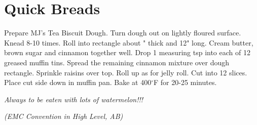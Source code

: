 \section{Quick Breads}
\begin{minipage}{\linewidth} 
Prepare MJ's Tea Biscuit Dough. Turn dough out on lightly floured surface. Knead 8-10 times. Roll into rectangle about " thick and 12" long. Cream butter, brown sugar and cinnamon together well. Drop 1 measuring tsp into each of 12 greased muffin tins. Spread the remaining cinnamon mixture over dough rectangle. Sprinkle raisins over top. Roll up as for jelly roll. Cut into 12 slices. Place cut side down in muffin pan. Bake at 400$^\circ$F for 20-25 minutes.

\end{minipage}\par\begin{minipage}{\linewidth} 
\textit{Always to be eaten with lots of watermelon!!!} \\

\end{minipage}\par\begin{minipage}{\linewidth}   
\textit{(EMC Convention in High Level, AB)}\\


\end{minipage}

